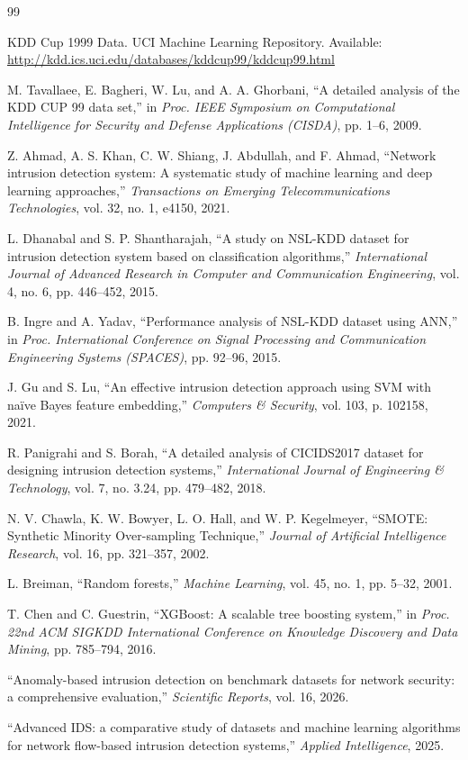 \documentclass[conference, twocolumn]{IEEEtran}
\begin{document}
\begin{thebibliography}{99}

KDD Cup 1999 Data. UCI Machine Learning Repository. Available: \url{http://kdd.ics.uci.edu/databases/kddcup99/kddcup99.html}

M. Tavallaee, E. Bagheri, W. Lu, and A. A. Ghorbani, ``A detailed analysis of the KDD CUP 99 data set,'' in \textit{Proc. IEEE Symposium on Computational Intelligence for Security and Defense Applications (CISDA)}, pp. 1--6, 2009.

Z. Ahmad, A. S. Khan, C. W. Shiang, J. Abdullah, and F. Ahmad, ``Network intrusion detection system: A systematic study of machine learning and deep learning approaches,'' \textit{Transactions on Emerging Telecommunications Technologies}, vol. 32, no. 1, e4150, 2021.

L. Dhanabal and S. P. Shantharajah, ``A study on NSL-KDD dataset for intrusion detection system based on classification algorithms,'' \textit{International Journal of Advanced Research in Computer and Communication Engineering}, vol. 4, no. 6, pp. 446--452, 2015.

B. Ingre and A. Yadav, ``Performance analysis of NSL-KDD dataset using ANN,'' in \textit{Proc. International Conference on Signal Processing and Communication Engineering Systems (SPACES)}, pp. 92--96, 2015.

J. Gu and S. Lu, ``An effective intrusion detection approach using SVM with na\"ive Bayes feature embedding,'' \textit{Computers \& Security}, vol. 103, p. 102158, 2021.

R. Panigrahi and S. Borah, ``A detailed analysis of CICIDS2017 dataset for designing intrusion detection systems,'' \textit{International Journal of Engineering \& Technology}, vol. 7, no. 3.24, pp. 479--482, 2018.

N. V. Chawla, K. W. Bowyer, L. O. Hall, and W. P. Kegelmeyer, ``SMOTE: Synthetic Minority Over-sampling Technique,'' \textit{Journal of Artificial Intelligence Research}, vol. 16, pp. 321--357, 2002.

L. Breiman, ``Random forests,'' \textit{Machine Learning}, vol. 45, no. 1, pp. 5--32, 2001.

T. Chen and C. Guestrin, ``XGBoost: A scalable tree boosting system,'' in \textit{Proc. 22nd ACM SIGKDD International Conference on Knowledge Discovery and Data Mining}, pp. 785--794, 2016.

``Anomaly-based intrusion detection on benchmark datasets for network security: a comprehensive evaluation,'' \textit{Scientific Reports}, vol. 16, 2026.

``Advanced IDS: a comparative study of datasets and machine learning algorithms for network flow-based intrusion detection systems,'' \textit{Applied Intelligence}, 2025.

\end{thebibliography}
\end{document}
